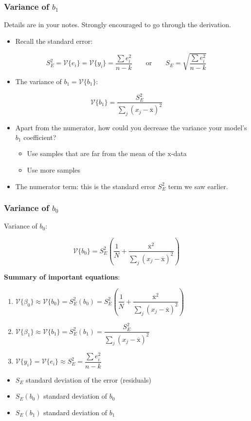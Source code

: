 \begin{frame}\frametitle{Variance of $b_1$}

	Details are in your notes. Strongly encouraged to go through the derivation.
	\begin{itemize}
		\item	Recall the standard error:
	\end{itemize}

	$$ S_E^2 = \mathcal{V}\{e_i\} = \mathcal{V}\{y_i\} = \dfrac{\sum{e_i^2}}{n-k} \qquad \text{or}\qquad S_E = \sqrt{ \dfrac{\sum{e_i^2}}{n-k} } $$
	\begin{itemize}
		\item	The variance of $b_1 = \mathcal{V}\{b_1\}$:
	\end{itemize}
	$$ \mathcal{V}\{b_1\} = \dfrac{S_E^2}{\sum_j{\left( x_j - \overline{\mathrm{x}} \right)^2}} $$
	\begin{itemize}
		\item	Apart from the numerator, how could you decrease the variance your model's $b_1$ coefficient?
		\begin{itemize}
			\item	Use samples that are far from the mean of the $\mathrm{x}$-data
			\item	Use more samples
		\end{itemize}
		\item	The numerator term: this is the standard error $S_E^2$ term we saw earlier.
	\end{itemize}
\end{frame}

\begin{frame}\frametitle{Variance of $b_0$}

	Variance of $b_0$:

	$$ \mathcal{V}\{b_0\} = S_E^2 \left(\dfrac{1}{N} + \dfrac{\overline{\mathrm{x}}^2}{\sum_j{\left( x_j - \overline{\mathrm{x}} \right)^2}} \right) $$

	\textbf{Summary of important equations}:
	\begin{enumerate}
		\item	$\mathcal{V}\{\beta_0\} \approx \mathcal{V}\{b_0\} = S_E^2(b_0) = S_E^2 \left(\dfrac{1}{N} + \dfrac{\overline{\mathrm{x}}^2}{\sum_j{\left( x_j - \overline{\mathrm{x}} \right)^2}} \right)$
		\item	$\mathcal{V}\{\beta_1\} \approx \mathcal{V}\{b_1\} = S_E^2(b_1) = \dfrac{S_E^2}{\sum_j{\left( x_j - \overline{\mathrm{x}} \right)^2}}$
		\item	$\mathcal{V}\{y_i\} = \mathcal{V}\{e_i\} \approx S_E^2 = \dfrac{\sum{e_i^2}}{n-k}$
	\end{enumerate}
	\begin{itemize}
		\item	$S_E$ standard deviation of the error (residuals)
		\item	$S_E(b_0)$ standard deviation of $b_0$
		\item	$S_E(b_1)$ standard deviation of $b_1$
	\end{itemize}
\end{frame}

